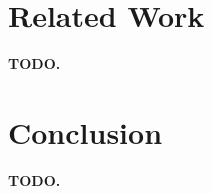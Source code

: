 \documentclass[sigconf,nonacm]{acmart}
\begin{document}
\section{Related Work}
\label{sec:related}





\textbf{TODO.}


\section{Conclusion}
\label{sec:conclusion}

%

\textbf{TODO.}




\end{document}
